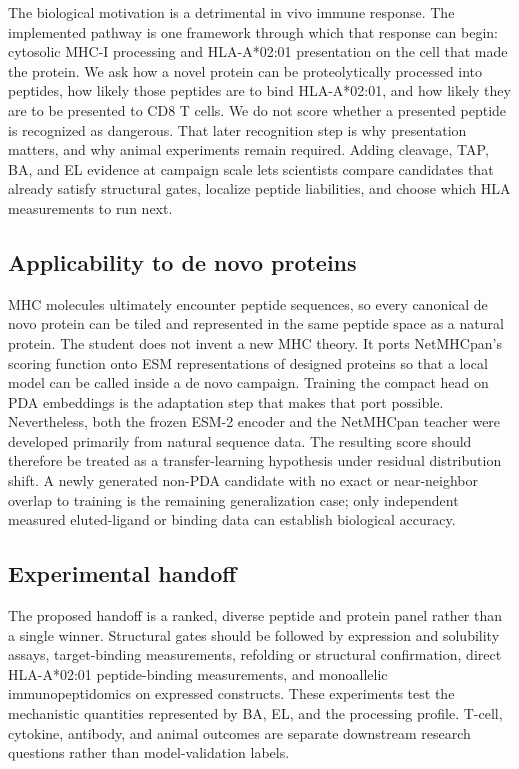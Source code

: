 \documentclass{article}
\begin{document}
The biological motivation is a detrimental in vivo immune response. The implemented pathway is one framework through which that response can begin: cytosolic MHC-I processing and HLA-A*02:01 presentation on the cell that made the protein. We ask how a novel protein can be proteolytically processed into peptides, how likely those peptides are to bind HLA-A*02:01, and how likely they are to be presented to CD8 T cells. We do not score whether a presented peptide is recognized as dangerous. That later recognition step is why presentation matters, and why animal experiments remain required. Adding cleavage, TAP, BA, and EL evidence at campaign scale lets scientists compare candidates that already satisfy structural gates, localize peptide liabilities, and choose which HLA measurements to run next.

\subsection{Applicability to de novo proteins}
MHC molecules ultimately encounter peptide sequences, so every canonical de novo protein can be tiled and represented in the same peptide space as a natural protein. The student does not invent a new MHC theory. It ports NetMHCpan's scoring function onto ESM representations of designed proteins so that a local model can be called inside a de novo campaign. Training the compact head on PDA embeddings is the adaptation step that makes that port possible. Nevertheless, both the frozen ESM-2 encoder and the NetMHCpan teacher were developed primarily from natural sequence data. The resulting score should therefore be treated as a transfer-learning hypothesis under residual distribution shift. A newly generated non-PDA candidate with no exact or near-neighbor overlap to training is the remaining generalization case; only independent measured eluted-ligand or binding data can establish biological accuracy.

\subsection{Experimental handoff}
The proposed handoff is a ranked, diverse peptide and protein panel rather than a single winner. Structural gates should be followed by expression and solubility assays, target-binding measurements, refolding or structural confirmation, direct HLA-A*02:01 peptide-binding measurements, and monoallelic immunopeptidomics on expressed constructs. These experiments test the mechanistic quantities represented by BA, EL, and the processing profile. T-cell, cytokine, antibody, and animal outcomes are separate downstream research questions rather than model-validation labels.
\end{document}
